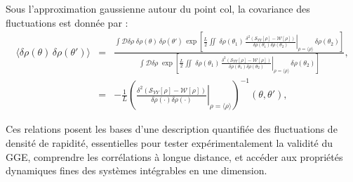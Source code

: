 Sous l’approximation gaussienne autour du point col, la covariance des fluctuations est donnée par :
\begin{eqnarray}
\langle \delta \rho(\theta) \, \delta \rho(\theta') \rangle &=& \frac{
 \displaystyle \int \mathcal{D} \delta \rho \; \delta \rho(\theta) \, \delta \rho(\theta') 
    \, \exp \left[ 
        \frac{L}{2} 
        \iint  \; 
        \delta \rho(\theta_1) \,  \left. \frac{\delta^2 (\mathcal{S}_{YY}[\rho] - \mathcal{W}[\rho]) }{\delta \rho(\theta_1)\delta \rho(\theta_2)} \right|_{\rho = \langle \rho \rangle } \, \delta \rho(\theta_2) 
    \right]
}{
    \displaystyle \int \mathcal{D} \delta \rho \; 
    \exp \left[ 
        \frac{L}{2} 
        \iint  \; 
        \delta \rho(\theta_1) \, \left. \frac{\delta^2 (\mathcal{S}_{YY}[\rho] - \mathcal{W}[\rho]) }{\delta \rho(\theta_1)\delta \rho(\theta_2)} \right|_{\rho = \langle \rho \rangle } \, \delta \rho(\theta_2) 
    \right]
}, \nonumber \\
&=& -\frac{1}{L} \left( \left. \frac{\delta^2 (\mathcal{S}_{YY}[\rho] - \mathcal{W}[\rho]) }{\delta \rho(\cdot)\delta \rho(\cdot)} \right|_{\rho = \langle \rho \rangle } \right)^{-1}(\theta, \theta'), \label{eq:fluctuations}
\end{eqnarray}


Ces relations posent les bases d'une description quantifiée des fluctuations de densité de rapidité, essentielles pour tester expérimentalement la validité du GGE, comprendre les corrélations à longue distance, et accéder aux propriétés dynamiques fines des systèmes intégrables en une dimension.




